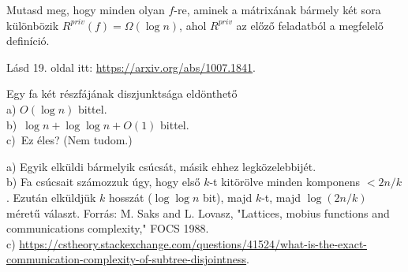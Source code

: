 \begin{Exercise}[counter={sorszam}, difficulty=2]
	Mutasd meg, hogy minden olyan $f$-re, aminek a m\'atrix\'anak b\'armely k\'et sora k\"ul\"onb\"ozik $R^{priv}(f)=\Omega(\log n)$, ahol $R^{priv}$ az el\H oz\H o feladatb\'ol a megfelel\H o defin\'ici\'o.
\end{Exercise}
\begin{Answer}
	L\'asd 19. oldal itt: \url{https://arxiv.org/abs/1007.1841}.%
\end{Answer}


\begin{Exercise}[counter={sorszam}, difficulty=0]
	Egy fa k\'et r\'eszf\'aj\'anak diszjunkts\'aga eld\"onthet\H o\\
	a) $O(\log n)$ bittel.\\
	b)~\hard $\log n +\log\log n+O(1)$ bittel.\\
	c)~\veryhard Ez \'eles? (Nem tudom.)
\end{Exercise}
\begin{Answer}
	a) Egyik elk\"uldi b\'armelyik cs\'ucs\'at, m\'asik ehhez legk\"ozelebbij\'et.\\
	b) Fa cs\'ucsait sz\'amozzuk \'ugy, hogy els\H o $k$-t kit\"or\"olve minden komponens $<2n/k$. Ezut\'an elk\"uldj\"uk $k$ hossz\'at ($\log \log n$ bit), majd $k$-t, majd $\log(2n/k)$ m\'eret\H u v\'alaszt.
	Forr\'as: M. Saks and L. Lovasz,  "Lattices, mobius functions and communications complexity," FOCS 1988.\\
	c) \url{https://cstheory.stackexchange.com/questions/41524/what-is-the-exact-communication-complexity-of-subtree-disjointness}.
\end{Answer}


